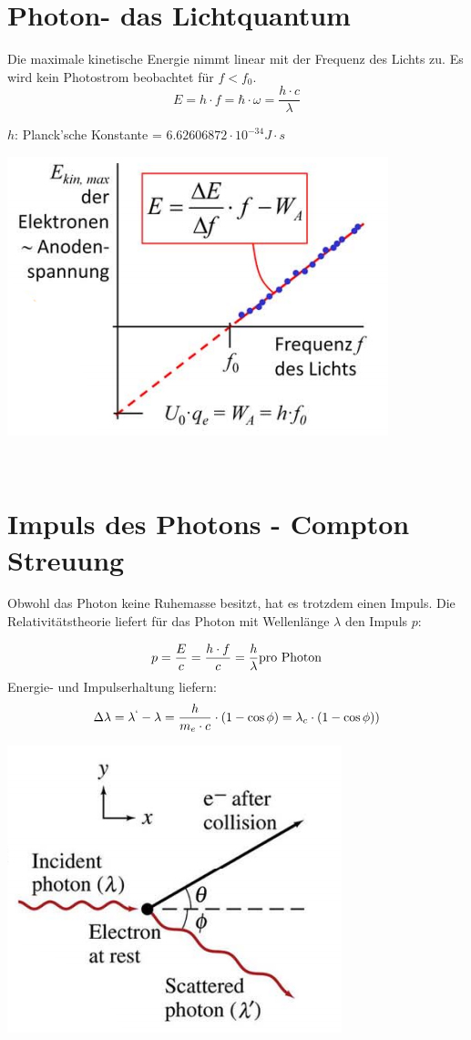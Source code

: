 \section{Photon- das Lichtquantum}
Die maximale kinetische Energie nimmt linear mit der Frequenz des Lichts zu. Es wird kein Photostrom beobachtet für $f<f_0$.\
\[
	E=h\cdot f = \hbar \cdot \omega = \frac{h \cdot c}{\lambda}
\]
\begin{footnotesize}
	$h$:	Planck'sche Konstante = $6.62606872\cdot 10^{-34} J\cdot s$\\
\end{footnotesize}
\begin{center}
	\includegraphics[scale = 0.3]{images/photon_energie.jpg}
\end{center}
\
\\
\section{Impuls des Photons - Compton Streuung}
Obwohl das Photon keine Ruhemasse besitzt, hat es trotzdem einen Impuls. Die Relativitätstheorie liefert für das Photon mit Wellenlänge $\lambda$ den Impuls $p$:\

\[
	p=\frac{E}{c}=\frac{h\cdot f}{c}= \frac{h}{\lambda} \\ \text{pro Photon} \\ \\
\]
Energie- und Impulserhaltung liefern:
\[
	\Delta\lambda = \lambda^` -\lambda=\frac{h}{m_e\cdot c}\cdot \left( 1- \cos \phi  \right) = \lambda_c \cdot \left( 1- \cos \phi   \right) )
\]
\begin{center}
	\includegraphics[scale = 0.3]{images/impuls_photon.jpg}
\end{center}
\

